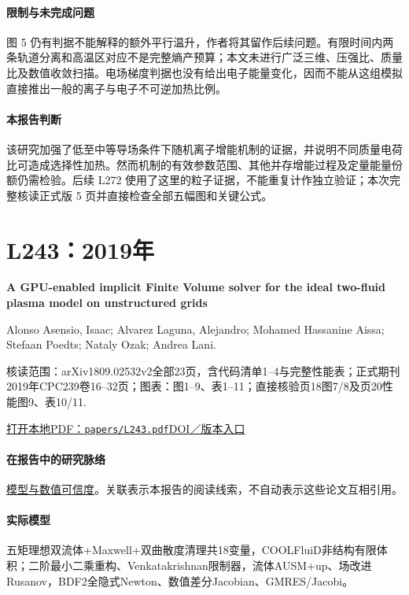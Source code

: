 \paragraph{限制与未完成问题}图 5 仍有判据不能解释的额外平行温升，作者将其留作后续问题。有限时间内两条轨道分离和高温区对应不是完整熵产预算；本文未进行广泛三维、压强比、质量比及数值收敛扫描。电场梯度判据也没有给出电子能量变化，因而不能从这组模拟直接推出一般的离子与电子不可逆加热比例。

\paragraph{本报告判断}该研究加强了低至中等导场条件下随机离子增能机制的证据，并说明不同质量电荷比可造成选择性加热。然而机制的有效参数范围、其他并存增能过程及定量能量份额仍需检验。后续 L272 使用了这里的粒子证据，不能重复计作独立验证；本次完整核读正式版 5 页并直接检查全部五幅图和关键公式。

\section{L243：2019年}\label{paper:L243}

\textbf{A GPU-enabled implicit Finite Volume solver for the ideal two-fluid plasma model on unstructured grids}\citep{L243}\

Alonso Asensio,  Isaac;  Alvarez Laguna,  Alejandro;  Mohamed Hassanine Aissa;  Stefaan Poedts;  Nataly Ozak;  Andrea Lani.

\textsf{核读范围：}arXiv1809.02532v2全部23页，含代码清单1–4与完整性能表；正式期刊2019年CPC239卷16–32页；\textsf{图表：}图1–9、表1–11；直接核验页18图7/8及页20性能图9、表10/11.

\href{run:papers/L243.pdf}{打开本地PDF：\texttt{papers/L243.pdf}}\quad\href{https://doi.org/10.1016/j.cpc.2019.01.019}{DOI／版本入口}

\paragraph{在报告中的研究脉络}\hyperref[ch:numerics]{模型与数值可信度}。关联表示本报告的阅读线索，不自动表示这些论文互相引用。

\paragraph{实际模型}五矩理想双流体+Maxwell+双曲散度清理共18变量，COOLFluiD非结构有限体积；二阶最小二乘重构、Venkatakrishnan限制器，流体AUSM+up、场改进Rusanov，BDF2全隐式Newton、数值差分Jacobian、GMRES/Jacobi。

